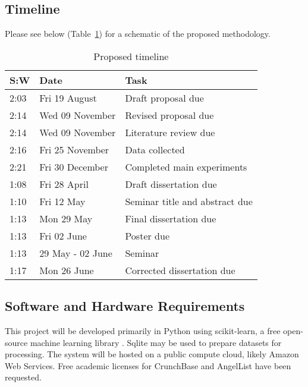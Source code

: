 \documentclass[../thesis/thesis.tex]{subfiles}
\begin{document}
\subsection*{Timeline}

Please see below (Table~\ref{tab:revised_proposal:timeline}) for a schematic of the proposed methodology.

\begin{table}[!h]
  \centering
    \begin{tabular}{l|l|l}
    \toprule
    \textbf{S:W} & \textbf{Date} & \textbf{Task} \\
    \midrule
    {2:03} & Fri 19 August & Draft proposal due \\
    {2:14} & Wed 09 November & Revised proposal due \\
    {2:14} & Wed 09 November & Literature review due \\
    {2:16} & Fri 25 November & Data collected \\
    {2:21} & Fri 30 December & Completed main experiments \\
    {1:08} & Fri 28 April & Draft dissertation due \\
    {1:10} & Fri 12 May & Seminar title and abstract due \\
    {1:13} & Mon 29 May & Final dissertation due \\
    {1:13} & Fri 02 June & Poster due \\
    {1:13} & 29 May - 02 June & Seminar \\
    {1:17} & Mon 26 June & Corrected dissertation due \\
    \bottomrule
    \end{tabular}%
  \caption{Proposed timeline}
  \label{tab:revised_proposal:timeline}%
\end{table}%

\subsection*{Software and Hardware Requirements}

This project will be developed primarily in Python using scikit-learn, a free open-source machine learning library \cite{scikitlearn}. Sqlite may be used to prepare datasets for processing. The system will be hosted on a public compute cloud, likely Amazon Web Services. Free academic licenses for CrunchBase and AngelList have been requested.

\end{document}
